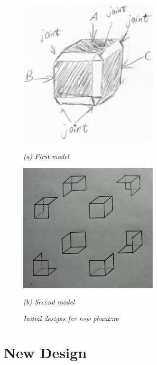 \begin{figure}[htb]
  \begin{minipage}[b]{2.75in}
    \centering
    \centerline{\mbox{\includegraphics[width=2.75in]{phantom/images/brain_storm/model1.eps}}}
    \centerline{\emph{(a) First model}}
  \end{minipage}\medskip
  \begin{minipage}[b]{2.75in}
    \centering
    \centerline{\mbox{\includegraphics[width=2.75in]{phantom/images/brain_storm/model2.eps}}}
    \centerline{\emph{(b) Second model}}
  \end{minipage}
  \caption{\emph{Initial designs for new phantom}}
  \label{fig:initial_phantom_design}
\end{figure}

\section{New Design}

